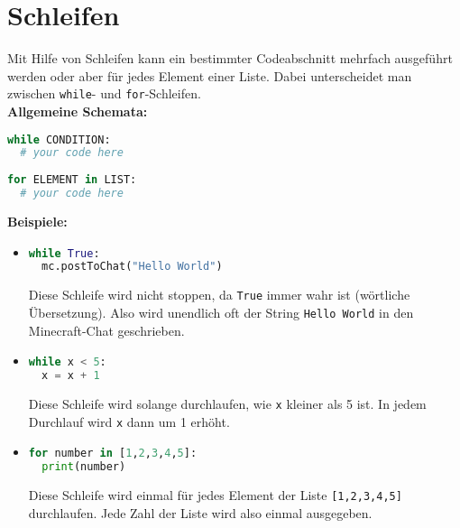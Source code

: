 \documentclass{article}
\begin{document}
	\section{Schleifen}
	Mit Hilfe von Schleifen kann ein bestimmter Codeabschnitt mehrfach ausgeführt werden oder aber für jedes Element einer Liste. Dabei unterscheidet man zwischen \texttt{while}- und \texttt{for}-Schleifen.\\
	\textbf{Allgemeine Schemata:}
	\begin{lstlisting}[language=Python]
while CONDITION:
  # your code here
	
for ELEMENT in LIST:
  # your code here
	\end{lstlisting}
	\textbf{Beispiele:}
	\begin{itemize}
		\item \begin{lstlisting}[language=Python]
while True:
  mc.postToChat("Hello World")
		\end{lstlisting}
		Diese Schleife wird nicht stoppen, da \texttt{True} immer wahr ist (wörtliche Übersetzung). Also wird unendlich oft der String \texttt{Hello World} in den Minecraft-Chat geschrieben.
		
		\item \begin{lstlisting}[language=Python]
while x < 5:
  x = x + 1
		\end{lstlisting}
		Diese Schleife wird solange durchlaufen, wie \texttt{x} kleiner als 5 ist. In jedem Durchlauf wird \texttt{x} dann um 1 erhöht.
		
		\item \begin{lstlisting}[language=Python]
for number in [1,2,3,4,5]:
  print(number)
		\end{lstlisting}
		Diese Schleife wird einmal für jedes Element der Liste \texttt{[1,2,3,4,5]} durchlaufen. Jede Zahl der Liste wird also einmal ausgegeben.
	\end{itemize}
\end{document}
